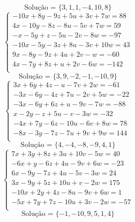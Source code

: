 \documentclass[12pt,oneside,a4paper]{article}
\begin{document}
\begin{equation*}
\text{Solução = }\{3,1,1,-4,10,8\}
\end{equation*}
\vspace{\baselineskip}
\begin{equation*}
\begin{cases}
-10x+8y-9z+5u+3v+7w=88 \\
4x-10y-8z-8u-5v+7w=59 \\
-x-5y+z-5u-2v-8w=-97 \\
-10x-5y-3z+8u-3v+10w=43 \\
9x-8y-9z+4u+2v-w=-60 \\
4x-7y+8z+u+2v-6w=-142 \\
\end{cases}
\end{equation*}
\begin{equation*}
\text{Solução = }\{3,9,-2,-1,-10,9\}
\end{equation*}
\vspace{\baselineskip}
\begin{equation*}
\begin{cases}
3x+6y+4z-u-7v+2w=-61 \\
-3x-6y-4z+7u-2v+5w=-22 \\
-3x-6y+6z+u-9v-7w=-88 \\
x-2y-z+5u-v-3w=-32 \\
-4x+7y-6z-10u-6v+8w=78 \\
-8x-3y-7z-7u+9v+9w=144 \\
\end{cases}
\end{equation*}
\begin{equation*}
\text{Solução = }\{4,-4,-8,-9,4,1\}
\end{equation*}
\vspace{\baselineskip}
\begin{equation*}
\begin{cases}
7x+3y+8z+3u+10v-5w=40 \\
-6x+y-6z+4u-9v+6w=-23 \\
6x-9y-7z+4u-5v-3w=24 \\
3x-9y+5z+10u+v-2w=175 \\
-10x+2y+4z-8u-9v+6w=1 \\
-5x+7y+7z-10u+3v-2w=-57 \\
\end{cases}
\end{equation*}
\begin{equation*}
\text{Solução = }\{-1,-10,9,5,1,4\}
\end{equation*}
\end{document}
